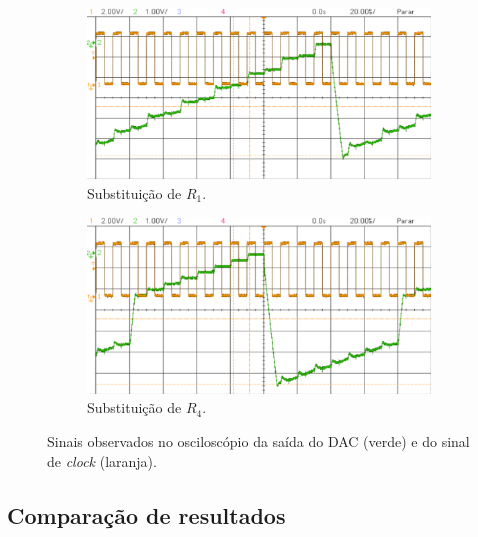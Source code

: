 \documentclass[a4paper, oneside]{article}
\begin{document}
\begin{figure}[ht]
	\centering
	\begin{subfigure}[b]{0.5\textwidth}
		\centering
		\includegraphics[width=\textwidth]{figures/DAC_R1_exp.png}
		\caption{Substituição de $R_1$.}
		\label{fig:DAC_R1_exp}
	\end{subfigure}%
	\hfill
	\begin{subfigure}[b]{0.5\textwidth}
		\centering
		\includegraphics[width=\textwidth]{figures/DAC_R4_exp.png}
		\caption{Substituição de $R_4$.}
		\label{fig:DAC_R4_exp}
	\end{subfigure}%
	\caption{Sinais observados no osciloscópio da saída do DAC (verde) e do sinal de \textit{clock} (laranja).\\}
	\label{fig:DAC_R1_R4_exp}
\end{figure}

\subsection{Comparação de resultados}
\end{document}
